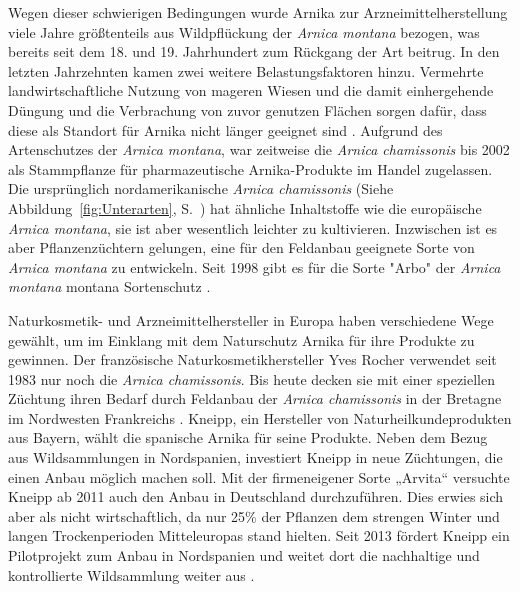 Wegen dieser schwierigen Bedingungen wurde Arnika zur Arzneimittelherstellung viele Jahre größtenteils aus Wildpflückung der \textit{Arnica montana} bezogen, was bereits seit dem 18. und 19. Jahrhundert zum Rückgang der Art beitrug. In den letzten Jahrzehnten kamen zwei weitere Belastungsfaktoren hinzu. Vermehrte landwirtschaftliche Nutzung von mageren Wiesen und die damit einhergehende Düngung und die Verbrachung von zuvor genutzen Flächen sorgen dafür, dass diese als Standort für Arnika nicht länger geeignet sind \citep[vgl.][]{Franke2012}.
Aufgrund des Artenschutzes der \textit{Arnica montana}, war zeitweise die \textit{Arnica chamissonis} bis 2002 als Stammpflanze für pharmazeutische Arnika-Produkte im Handel zugelassen. Die ursprünglich nordamerikanische \textit{Arnica chamissonis} (Siehe Abbildung~\ref{fig:Unterarten}, S.~\pageref{fig:Unterarten}) hat ähnliche Inhaltstoffe wie die europäische \textit{Arnica montana}, sie ist aber wesentlich leichter zu kultivieren. Inzwischen ist es aber Pflanzenzüchtern gelungen, eine für den Feldanbau geeignete Sorte von \textit{Arnica montana} zu entwickeln. Seit 1998 gibt es für die Sorte "Arbo" der \textit{Arnica montana} montana Sortenschutz \citep[vgl.][S. 178]{Schoenfelder2015}.


Naturkosmetik- und Arzneimittelhersteller in Europa haben verschiedene Wege gewählt, um im Einklang mit dem Naturschutz Arnika für ihre Produkte zu gewinnen. Der französische Naturkosmetikhersteller Yves Rocher verwendet seit 1983 nur noch die \textit{Arnica chamissonis}. Bis heute decken sie mit einer speziellen Züchtung ihren Bedarf durch Feldanbau der \textit{Arnica chamissonis} in der Bretagne im Nordwesten Frankreichs \citep[vgl.][]{Rocher2019}. Kneipp, ein Hersteller von Naturheilkundeprodukten aus Bayern, wählt die spanische Arnika für seine Produkte. Neben dem Bezug aus Wildsammlungen in Nordspanien, investiert Kneipp in neue Züchtungen, die einen Anbau möglich machen soll. Mit der firmeneigener Sorte „Arvita“ versuchte Kneipp ab 2011 auch den Anbau in Deutschland durchzuführen. Dies erwies sich aber als nicht wirtschaftlich, da nur 25\% der Pflanzen dem strengen Winter und langen Trockenperioden Mitteleuropas stand hielten. Seit 2013 fördert Kneipp ein Pilotprojekt zum Anbau in Nordspanien und weitet dort die nachhaltige und kontrollierte Wildsammlung weiter aus \citep[vgl.][]{Kneipp2019, Markenverband2019}.

